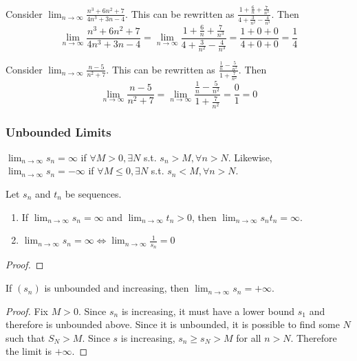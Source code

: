 \documentclass[../notes.tex]{subfiles}
\begin{document}
\begin{example}
    Consider $\lim_{n\to\infty} \frac{n^3 + 6n^2 +7}{4n^3 + 3n - 4}$. This can be rewritten as $\frac{1 + \frac{6}{n} + \frac{7}{n^3}}{4 + \frac{3}{n^2} - \frac{4}{n^3}}$. Then
    \[
        \lim_{n\to\infty} \frac{n^3 + 6n^2 +7}{4n^3 + 3n - 4} = \lim_{n\to\infty} \frac{1 + \frac{6}{n} + \frac{7}{n^3}}{4 + \frac{3}{n^2} - \frac{4}{n^3}} = \frac{1 + 0 + 0}{4 + 0 + 0} = \frac{1}{4}
    \]
\end{example}
\begin{example}
    Consider $\lim_{n\to\infty} \frac{n-5}{n^2 + 7}$. This can be rewritten as $\frac{\frac{1}{n} - \frac{5}{n^2}}{1 + \frac{7}{n^2}}$. Then
    \[
        \lim_{n\to\infty} \frac{n-5}{n^2 + 7} = \lim_{n\to\infty} \frac{\frac{1}{n} - \frac{5}{n^2}}{1 + \frac{7}{n^2}} = \frac{0}{1} = 0
    \]
\end{example}

\subsubsection{Unbounded Limits}
\begin{definition}
    $\lim_{n\to\infty} s_n = \infty$ if $\forall M > 0, \exists N$ s.t. $s_n > M, \forall n > N$. Likewise, $\lim_{n\to\infty} s_n = -\infty$ if $\forall M \leq 0, \exists N$ s.t. $s_n < M, \forall n > N$.
\end{definition}

\begin{theorem}
    Let $s_n$ and $t_n$ be sequences.
    \begin{enumerate}
        \item If $\lim_{n\to\infty} s_n = \infty$ and $\lim_{n\to\infty} t_n > 0$, then $\lim_{n\to\infty} s_n t_n = \infty$.
        \item $\lim_{n\to\infty} s_n = \infty \Leftrightarrow \lim_{n\to\infty} \frac{1}{s_n} = 0$
    \end{enumerate}
\end{theorem}
\begin{proof}
\end{proof}

\begin{theorem}
    If $(s_n)$ is unbounded and increasing, then $\lim_{n\to \infty} s_n = +\infty$.
\end{theorem}
\begin{proof}
    Fix $M > 0$. Since $s_n$ is increasing, it must have a lower bound $s_1$ and therefore is unbounded above. Since it is unbounded, it is possible to find some $N$ such that $S_N > M$. Since $s$ is increasing, $s_n \geq s_N > M$ for all $n > N$. Therefore the limit is $+\infty$.
\end{proof}
\end{document}
